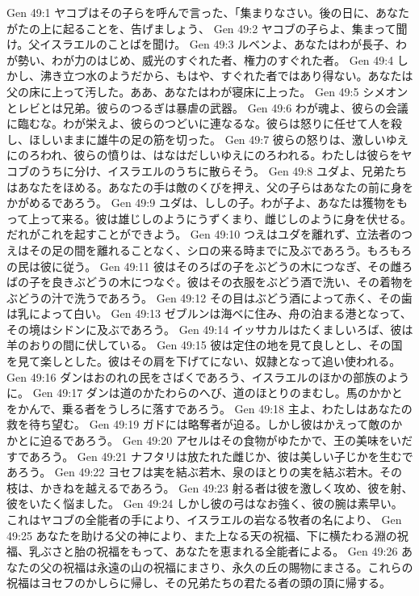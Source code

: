 Gen 49:1  ヤコブはその子らを呼んで言った、「集まりなさい。後の日に、あなたがたの上に起ることを、告げましょう、
Gen 49:2  ヤコブの子らよ、集まって聞け。父イスラエルのことばを聞け。
Gen 49:3  ルベンよ、あなたはわが長子、わが勢い、わが力のはじめ、威光のすぐれた者、権力のすぐれた者。
Gen 49:4  しかし、沸き立つ水のようだから、もはや、すぐれた者ではあり得ない。あなたは父の床に上って汚した。ああ、あなたはわが寝床に上った。
Gen 49:5  シメオンとレビとは兄弟。彼らのつるぎは暴虐の武器。
Gen 49:6  わが魂よ、彼らの会議に臨むな。わが栄えよ、彼らのつどいに連なるな。彼らは怒りに任せて人を殺し、ほしいままに雄牛の足の筋を切った。
Gen 49:7  彼らの怒りは、激しいゆえにのろわれ、彼らの憤りは、はなはだしいゆえにのろわれる。わたしは彼らをヤコブのうちに分け、イスラエルのうちに散らそう。
Gen 49:8  ユダよ、兄弟たちはあなたをほめる。あなたの手は敵のくびを押え、父の子らはあなたの前に身をかがめるであろう。
Gen 49:9  ユダは、ししの子。わが子よ、あなたは獲物をもって上って来る。彼は雄じしのようにうずくまり、雌じしのように身を伏せる。だれがこれを起すことができよう。
Gen 49:10  つえはユダを離れず、立法者のつえはその足の間を離れることなく、シロの来る時までに及ぶであろう。もろもろの民は彼に従う。
Gen 49:11  彼はそのろばの子をぶどうの木につなぎ、その雌ろばの子を良きぶどうの木につなぐ。彼はその衣服をぶどう酒で洗い、その着物をぶどうの汁で洗うであろう。
Gen 49:12  その目はぶどう酒によって赤く、その歯は乳によって白い。
Gen 49:13  ゼブルンは海べに住み、舟の泊まる港となって、その境はシドンに及ぶであろう。
Gen 49:14  イッサカルはたくましいろば、彼は羊のおりの間に伏している。
Gen 49:15  彼は定住の地を見て良しとし、その国を見て楽しとした。彼はその肩を下げてにない、奴隷となって追い使われる。
Gen 49:16  ダンはおのれの民をさばくであろう、イスラエルのほかの部族のように。
Gen 49:17  ダンは道のかたわらのへび、道のほとりのまむし。馬のかかとをかんで、乗る者をうしろに落すであろう。
Gen 49:18  主よ、わたしはあなたの救を待ち望む。
Gen 49:19  ガドには略奪者が迫る。しかし彼はかえって敵のかかとに迫るであろう。
Gen 49:20  アセルはその食物がゆたかで、王の美味をいだすであろう。
Gen 49:21  ナフタリは放たれた雌じか、彼は美しい子じかを生むであろう。
Gen 49:22  ヨセフは実を結ぶ若木、泉のほとりの実を結ぶ若木。その枝は、かきねを越えるであろう。
Gen 49:23  射る者は彼を激しく攻め、彼を射、彼をいたく悩ました。
Gen 49:24  しかし彼の弓はなお強く、彼の腕は素早い。これはヤコブの全能者の手により、イスラエルの岩なる牧者の名により、
Gen 49:25  あなたを助ける父の神により、また上なる天の祝福、下に横たわる淵の祝福、乳ぶさと胎の祝福をもって、あなたを恵まれる全能者による。
Gen 49:26  あなたの父の祝福は永遠の山の祝福にまさり、永久の丘の賜物にまさる。これらの祝福はヨセフのかしらに帰し、その兄弟たちの君たる者の頭の頂に帰する。
